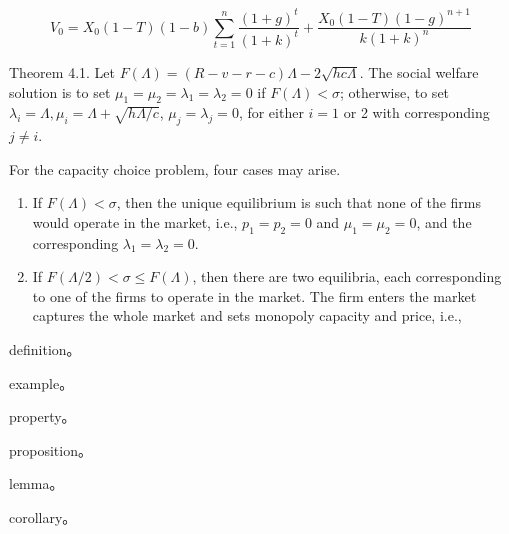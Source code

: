 \documentclass[
    writingLanguage=english, 
    addPageTitle=on,
    addDeclaration=on,
    addMUSTlog=off,
    printMod=off,
    refIndent=on,
    addFigTOC=on,
    addTabTOC=on,
]{.def/must}
\begin{document}
\begin{equation}
V_0=X_0(1-T)(1-b) \sum_{t=1}^n \frac{(1+g)^t}{(1+k)^t}+\frac{X_0(1-T)(1-g)^{n+1}}{k(1+k)^n}
\end{equation}


\begin{axiom}
Theorem 4.1. Let $F(\Lambda)=(R-v-r-c) \Lambda-2 \sqrt{h c \Lambda}$. The social welfare solution is to set $\mu_1=\mu_2=\lambda_1=\lambda_2=0$ if $F(\Lambda)<\sigma$; otherwise, to set $\lambda_i=\Lambda, \mu_i=\Lambda+\sqrt{h \Lambda / c}$, $\mu_j=\lambda_j=0$, for either $i=1$ or 2 with corresponding $j \neq i$.
\end{axiom}


\begin{theorem}
For the capacity choice problem, four
cases may arise.
\begin{enumerate}[itemsep=2pt,topsep=0pt,parsep=0pt,leftmargin=*,label=\emph{(\roman*)}]
    \item If $F(\Lambda)<\sigma$, then the unique equilibrium is such that none of the firms would operate in the market, i.e., $p_1=p_2=0$ and $\mu_1=\mu_2=0$, and the corresponding $\lambda_1=\lambda_2=0$.
    \item If $F(\Lambda / 2)<\sigma \leqslant F(\Lambda)$, then there are two equilibria, each corresponding to one of the firms to operate in the market. The firm enters the market captures the whole market and sets monopoly capacity and price, i.e.,
\end{enumerate}

\end{theorem}


\begin{definition}
 definition。
\end{definition}


\begin{example}
 example。
\end{example}



\begin{property}
 property。
\end{property}

\begin{proposition}
 proposition。
\end{proposition}


\begin{lemma}
 lemma。
\end{lemma}

\begin{corollary}
 corollary。
\end{corollary}
\end{document}
